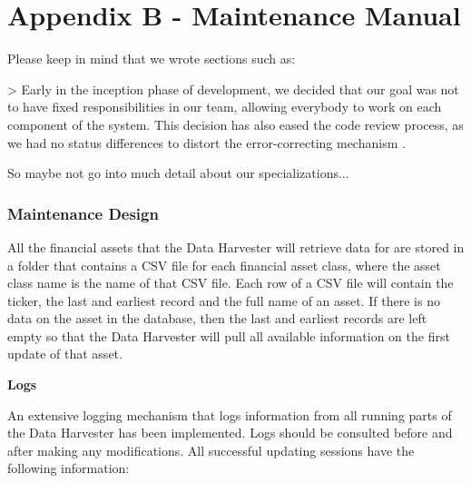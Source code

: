\documentclass[main.tex]{subfiles}
\begin{document}
\section{Appendix B - Maintenance Manual}
\label{MaintenanceManual}

Please keep in mind that we wrote sections such as:

> Early in the inception phase of development, we decided that our goal was not to have fixed responsibilities in our team, allowing everybody to work on each component of the system. This decision has also eased the code review process, as we had no status differences to distort the error-correcting mechanism \cite{statusdifference}.

So maybe not go into much detail about our specializations...

\subsubsection{Maintenance Design}

All the financial assets that the Data Harvester will retrieve data for are stored in a folder that contains a CSV file for each financial asset class, where the asset class name is the name of that CSV file. Each row of a CSV file will contain the ticker, the last and earliest record and the full name of an asset. If there is no data on the asset in the database, then the last and earliest records are left empty so that the Data Harvester will pull all available information on the first update of that asset.\newline

\textbf{Logs\newline}
\label{dhav_logs}

An extensive logging mechanism that logs information from all running parts of the Data Harvester has been implemented. Logs should be consulted before and after making any modifications. All successful updating sessions have the following information:
\end{document}
